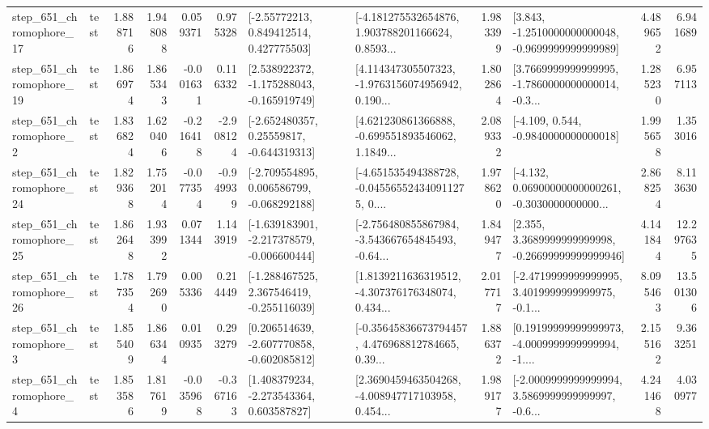 \begin{tabular}{llrrrrllrlrr}
  step\_651\_chromophore\_17 &      test &      1.888716 &    1.948088 &      0.059371 &  0.975328 &     [-2.55772213, 0.849412514, 0.427775503] &  [-4.181275532654876, 1.903788201166624, 0.8593... &       1.983399 &  [3.843, -1.2510000000000048, -0.9699999999999989] &            4.489652 &          6.941689 \\
  step\_651\_chromophore\_19 &      test &      1.866974 &    1.865343 &     -0.001631 &  0.116332 &   [2.538922372, -1.175288043, -0.165919749] &  [4.114347305507323, -1.9763156074956942, 0.190... &       1.802864 &  [3.7669999999999995, -1.7860000000000014, -0.3... &            1.285230 &          6.957113 \\
   step\_651\_chromophore\_2 &      test &      1.836824 &    1.620406 &     -0.216418 & -2.908124 &    [-2.652480357, 0.25559817, -0.644319313] &  [4.621230861366888, -0.699551893546062, 1.1849... &       2.089332 &               [-4.109, 0.544, -0.9840000000000018] &            1.995658 &          1.353016 \\
  step\_651\_chromophore\_24 &      test &      1.829368 &    1.752014 &     -0.077354 & -0.949939 &   [-2.709554895, 0.006586799, -0.068292188] &  [-4.651535494388728, -0.045565524340911275, 0.... &       1.978620 &  [-4.132, 0.06900000000000261, -0.3030000000000... &            2.868254 &          8.113630 \\
  step\_651\_chromophore\_25 &      test &      1.862648 &    1.933992 &      0.071344 &  1.143919 &  [-1.639183901, -2.217378579, -0.006600444] &  [-2.756480855867984, -3.543667654845493, -0.64... &       1.849477 &  [2.355, 3.3689999999999998, -0.26699999999999946] &            4.141844 &         12.297635 \\
  step\_651\_chromophore\_26 &      test &      1.787354 &    1.792690 &      0.005336 &  0.214449 &   [-1.288467525, 2.367546419, -0.255116039] &  [1.8139211636319512, -4.307376176348074, 0.434... &       2.017717 &  [-2.4719999999999995, 3.4019999999999975, -0.1... &            8.095463 &         13.501306 \\
   step\_651\_chromophore\_3 &      test &      1.855409 &    1.866344 &      0.010935 &  0.293279 &   [0.206514639, -2.607770858, -0.602085812] &  [-0.35645836673794457, 4.476968812784665, 0.39... &       1.886372 &  [0.19199999999999973, -4.0009999999999994, -1.... &            2.155162 &          9.363251 \\
   step\_651\_chromophore\_4 &      test &      1.853586 &    1.817619 &     -0.035968 & -0.367163 &    [1.408379234, -2.273543364, 0.603587827] &  [2.3690459463504268, -4.008947717103958, 0.454... &       1.989177 &  [-2.0009999999999994, 3.5869999999999997, -0.6... &            4.241468 &          4.030977 \\

\end{tabular}
